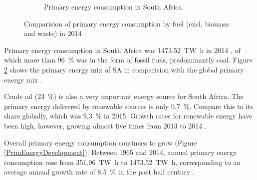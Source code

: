 \begin{figure}[!b]
\begin{subfigure}[b]{0.45\textwidth}
                \caption{Primary energy consumption in South Africa.}\label{PrimSA}
        \end{subfigure}
\caption[Comparision of primary energy consumption by fuel in 2014.]{Comparision of primary energy consumption by fuel (excl. biomass and waste) in 2014 \cite{BP2015b}.}\label{PEKreis}
\end{figure}
Primary energy consumption in South Africa was \SI{1473.52}{\tera\watt\hour} in 2014 \cite{BP2015b}, of which more than \SI{96}{\percent} was in the form of fossil fuels, predominantly coal. Figure \ref{PEKreis} shows the primary energy mix of SA in comparision with the global primary energy mix \cite{BP2015b}.

Crude oil (\SI{23}{\percent}) is also a very important energy source for South Africa. The primary energy delivered by renewable sources is only \SI{0.7}{\percent}. Compare this to its share globally, which was \SI{9.3}{\percent} in 2015. Growth rates for renewable energy have been high, however, growing almost five times from 2013 to 2014 \cite{BP2015b}.

Overall primary energy consumption continues to grow (Figure \ref{PrimEnergyDevelopment}). Between 1965 and 2014, annual primary energy consumption rose from \SI{351.96}{\tera\watt\hour} to \SI{1473.52}{\tera\watt\hour}, corresponding to an average annual growth rate of \SI{8.5}{\percent} in the past half century \cite{BP2015c}.

